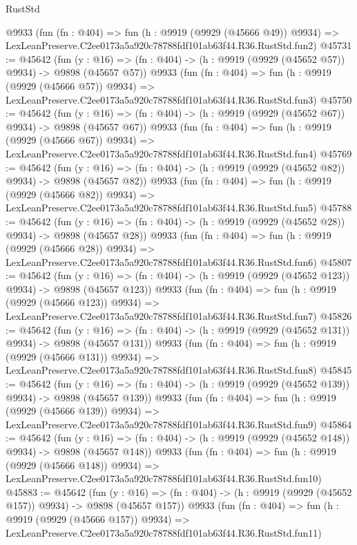\begin{lexlean}{RustStd}
\begin{coremodule}
    @9933
    (fun (fn : @404) =>
    fun (h : @9919 (@9929 (@45666 @49)) @9934) =>
    LexLeanPreserve.C2ee0173a5a920c78788fdf101ab63f44.R36.RustStd.fun2)
@45731 := @45642
    (fun (y : @16) => (fn : @404) -> (h : @9919 (@9929 (@45652 @57)) @9934) -> @9898 (@45657 @57))
    @9933
    (fun (fn : @404) =>
    fun (h : @9919 (@9929 (@45666 @57)) @9934) =>
    LexLeanPreserve.C2ee0173a5a920c78788fdf101ab63f44.R36.RustStd.fun3)
@45750 := @45642
    (fun (y : @16) => (fn : @404) -> (h : @9919 (@9929 (@45652 @67)) @9934) -> @9898 (@45657 @67))
    @9933
    (fun (fn : @404) =>
    fun (h : @9919 (@9929 (@45666 @67)) @9934) =>
    LexLeanPreserve.C2ee0173a5a920c78788fdf101ab63f44.R36.RustStd.fun4)
@45769 := @45642
    (fun (y : @16) => (fn : @404) -> (h : @9919 (@9929 (@45652 @82)) @9934) -> @9898 (@45657 @82))
    @9933
    (fun (fn : @404) =>
    fun (h : @9919 (@9929 (@45666 @82)) @9934) =>
    LexLeanPreserve.C2ee0173a5a920c78788fdf101ab63f44.R36.RustStd.fun5)
@45788 := @45642
    (fun (y : @16) => (fn : @404) -> (h : @9919 (@9929 (@45652 @28)) @9934) -> @9898 (@45657 @28))
    @9933
    (fun (fn : @404) =>
    fun (h : @9919 (@9929 (@45666 @28)) @9934) =>
    LexLeanPreserve.C2ee0173a5a920c78788fdf101ab63f44.R36.RustStd.fun6)
@45807 := @45642
    (fun (y : @16) => (fn : @404) -> (h : @9919 (@9929 (@45652 @123)) @9934) -> @9898 (@45657 @123))
    @9933
    (fun (fn : @404) =>
    fun (h : @9919 (@9929 (@45666 @123)) @9934) =>
    LexLeanPreserve.C2ee0173a5a920c78788fdf101ab63f44.R36.RustStd.fun7)
@45826 := @45642
    (fun (y : @16) => (fn : @404) -> (h : @9919 (@9929 (@45652 @131)) @9934) -> @9898 (@45657 @131))
    @9933
    (fun (fn : @404) =>
    fun (h : @9919 (@9929 (@45666 @131)) @9934) =>
    LexLeanPreserve.C2ee0173a5a920c78788fdf101ab63f44.R36.RustStd.fun8)
@45845 := @45642
    (fun (y : @16) => (fn : @404) -> (h : @9919 (@9929 (@45652 @139)) @9934) -> @9898 (@45657 @139))
    @9933
    (fun (fn : @404) =>
    fun (h : @9919 (@9929 (@45666 @139)) @9934) =>
    LexLeanPreserve.C2ee0173a5a920c78788fdf101ab63f44.R36.RustStd.fun9)
@45864 := @45642
    (fun (y : @16) => (fn : @404) -> (h : @9919 (@9929 (@45652 @148)) @9934) -> @9898 (@45657 @148))
    @9933
    (fun (fn : @404) =>
    fun (h : @9919 (@9929 (@45666 @148)) @9934) =>
    LexLeanPreserve.C2ee0173a5a920c78788fdf101ab63f44.R36.RustStd.fun10)
@45883 := @45642
    (fun (y : @16) => (fn : @404) -> (h : @9919 (@9929 (@45652 @157)) @9934) -> @9898 (@45657 @157))
    @9933
    (fun (fn : @404) =>
    fun (h : @9919 (@9929 (@45666 @157)) @9934) =>
    LexLeanPreserve.C2ee0173a5a920c78788fdf101ab63f44.R36.RustStd.fun11)

\end{coremodule}
\end{lexlean}
